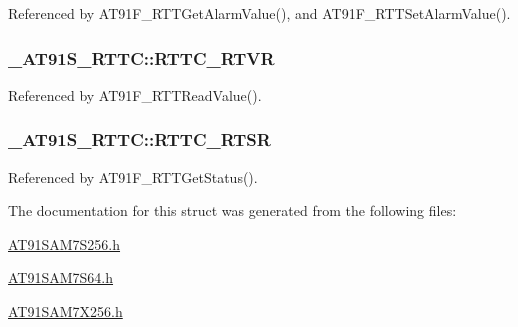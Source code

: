 Referenced by AT91F\_\-RTTGetAlarmValue(), and AT91F\_\-RTTSetAlarmValue().\hypertarget{struct__AT91S__RTTC_6939d12b84e3913d9d8bfeee281ea08f}{
\subsubsection{ {\bf \_\-AT91S\_\-RTTC::RTTC\_\-RTVR}}}
\label{struct__AT91S__RTTC_6939d12b84e3913d9d8bfeee281ea08f}




Referenced by AT91F\_\-RTTReadValue().\hypertarget{struct__AT91S__RTTC_482110506eb725a2c144619e0bb0547d}{
\subsubsection{ {\bf \_\-AT91S\_\-RTTC::RTTC\_\-RTSR}}}
\label{struct__AT91S__RTTC_482110506eb725a2c144619e0bb0547d}




Referenced by AT91F\_\-RTTGetStatus().

The documentation for this struct was generated from the following files:\begin{CompactItemize}
\item 
\hyperlink{AT91SAM7S256_8h}{AT91SAM7S256.h}\item 
\hyperlink{AT91SAM7S64_8h}{AT91SAM7S64.h}\item 
\hyperlink{AT91SAM7X256_8h}{AT91SAM7X256.h}\end{CompactItemize}
